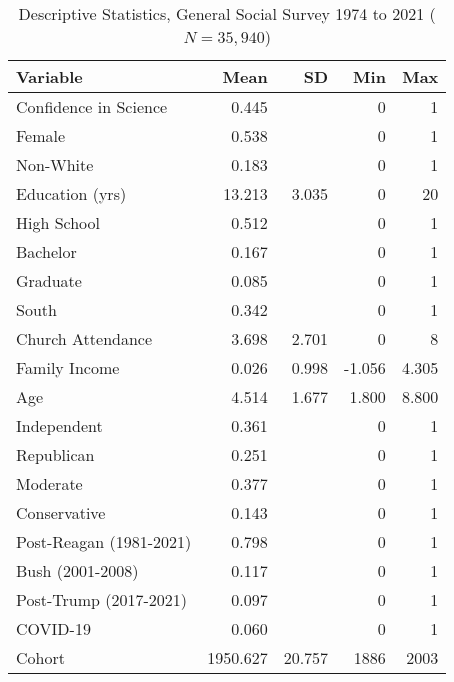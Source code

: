 \begin{table}[ht]
\centering
\caption{Descriptive Statistics, General Social Survey 1974 to 2021 ($N=35,940$)} 
\begin{tabularx}{\textwidth}{Xrrrr}
  \toprule
Variable & Mean & SD & Min & Max \\ 
  \midrule
Confidence in Science & 0.445 &  & 0 & 1 \\ 
  Female & 0.538 &  & 0 & 1 \\ 
  Non-White & 0.183 &  & 0 & 1 \\ 
  Education (yrs) & 13.213 & 3.035 & 0 & 20 \\ 
  High School & 0.512 &  & 0 & 1 \\ 
  Bachelor & 0.167 &  & 0 & 1 \\ 
  Graduate & 0.085 &  & 0 & 1 \\ 
  South & 0.342 &  & 0 & 1 \\ 
  Church Attendance & 3.698 & 2.701 & 0 & 8 \\ 
  Family Income & 0.026 & 0.998 & -1.056 & 4.305 \\ 
  Age & 4.514 & 1.677 & 1.800 & 8.800 \\ 
  Independent & 0.361 &  & 0 & 1 \\ 
  Republican & 0.251 &  & 0 & 1 \\ 
  Moderate & 0.377 &  & 0 & 1 \\ 
  Conservative & 0.143 &  & 0 & 1 \\ 
  Post-Reagan (1981-2021) & 0.798 &  & 0 & 1 \\ 
  Bush (2001-2008) & 0.117 &  & 0 & 1 \\ 
  Post-Trump (2017-2021) & 0.097 &  & 0 & 1 \\ 
  COVID-19 & 0.060 &  & 0 & 1 \\ 
  Cohort & 1950.627 & 20.757 & 1886 & 2003 \\ 
   \bottomrule
\end{tabularx}
\end{table}
